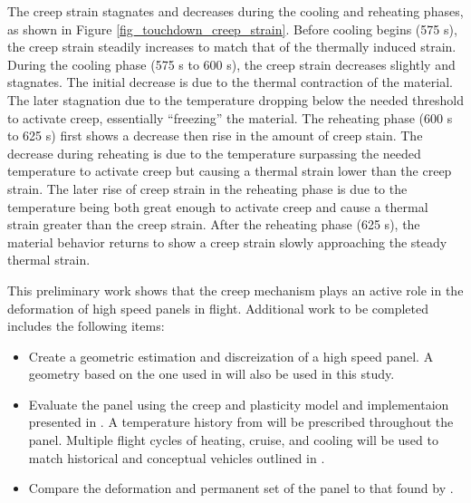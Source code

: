 \documentclass[conf]{new-aiaa}
\begin{document}
The creep strain stagnates and decreases during the cooling 
and reheating phases, as shown in Figure \ref{fig_touchdown_creep_strain}.
Before cooling begins (575 s), the creep strain steadily increases to 
match that of the thermally induced strain.
During the cooling phase (575 s to 600 s), the creep strain
decreases slightly and stagnates. 
The initial decrease is due to the thermal contraction of the material.
The later stagnation due to the temperature dropping below the needed 
threshold to activate creep, essentially ``freezing'' the material.
The reheating phase (600 s to 625 s) first shows a decrease then rise in 
the amount of creep stain.
The decrease during reheating is due to the temperature surpassing the
needed temperature to activate creep but causing a thermal strain
lower than the creep strain.
The later rise of creep strain in the reheating phase is due
to the temperature being both great enough to activate creep
and cause a thermal strain greater than the creep strain.
After the reheating phase (625 s), the material behavior
returns to show a creep strain slowly approaching the steady 
thermal strain.

This preliminary work shows that the creep mechanism plays an active role in the deformation 
of high speed panels in flight.
Additional work to be completed includes the following items:

\begin{itemize}
  \item Create a geometric estimation and discreization of a high speed panel.
        A geometry based on the one used in 
        \cite{ culler_impact_of_FTS_coupling_on_response_prediction_hypersonic_skin_panels}
        will also be used in this study.
  \item Evaluate the panel using the creep and plasticity model and implementaion presented in
        \cite{ li_simulation_of_finite_strain_inelastic_phenomena_governed_by_creep_and_plasticity}.
        A temperature history from 
        \cite{ culler_impact_of_FTS_coupling_on_response_prediction_hypersonic_skin_panels}
        will be prescribed throughout the panel. 
        Multiple flight cycles of heating, cruise, and cooling will be used
        to match historical and conceptual vehicles outlined in
        \cite{ kordes_structureal_heating_experiencs_on_the_x15_airplane,
               zuchowski_AVIATR_Predictive_capability_for_hypersonic_structural_response_and_life_prediction_phase_II}.
  \item Compare the deformation and permanent set of the panel to that 
        found by \cite{ culler_impact_of_FTS_coupling_on_response_prediction_hypersonic_skin_panels}.
\end{itemize}
\end{document}
